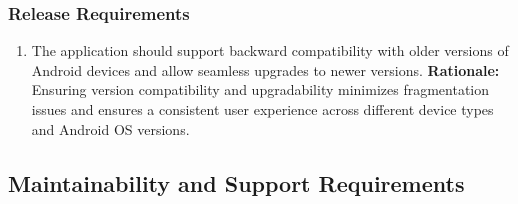 \documentclass[]{article}
\begin{document}
\subsubsection{Release Requirements}
\label{ssub:release_requirements}
\begin{enumerate}[{OE-R}1. ]
	\item The application should support backward compatibility with older versions of Android devices and allow seamless upgrades to newer versions. \newline
	      \textbf{Rationale:} Ensuring version compatibility and upgradability minimizes fragmentation issues and ensures a consistent user experience across different device types and Android OS versions.
\end{enumerate}


\subsection{Maintainability and Support Requirements}
\label{sub:maintainability_and_support_requirements}
\end{document}
